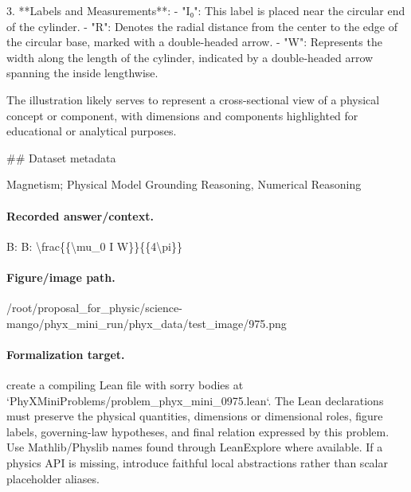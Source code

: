 3. **Labels and Measurements**:
   - "I₀": This label is placed near the circular end of the cylinder.
   - "R": Denotes the radial distance from the center to the edge of the circular base, marked with a double-headed arrow.
   - "W": Represents the width along the length of the cylinder, indicated by a double-headed arrow spanning the inside lengthwise.

The illustration likely serves to represent a cross-sectional view of a physical concept or component, with dimensions and components highlighted for educational or analytical purposes.

\#\# Dataset metadata

Magnetism; Physical Model Grounding Reasoning, Numerical Reasoning

\paragraph{Recorded answer/context.}
B: B: \textbackslash{}frac\{\{\textbackslash{}mu\_0 I W\}\}\{\{4\textbackslash{}pi\}\}

\paragraph{Figure/image path.}
/root/proposal\_for\_physic/science-mango/phyx\_mini\_run/phyx\_data/test\_image/975.png

\paragraph{Formalization target.}
create a compiling Lean file with sorry bodies at `PhyXMiniProblems/problem\_phyx\_mini\_0975.lean`. The Lean declarations must preserve the physical quantities, dimensions or dimensional roles, figure labels, governing-law hypotheses, and final relation expressed by this problem.
Use Mathlib/Physlib names found through LeanExplore where available. If a physics API is missing, introduce faithful local abstractions rather than scalar placeholder aliases.

